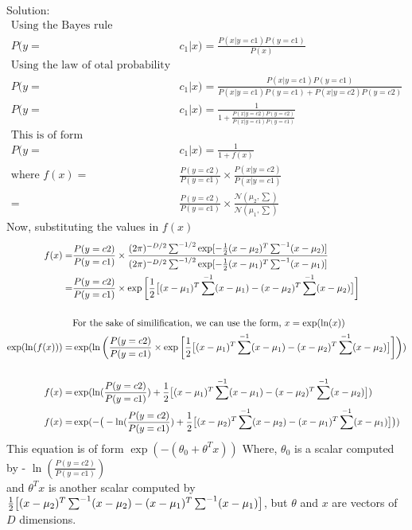 \documentclass[letterpaper,doc,notimes]{apa6}
\begin{document}
{\noindent Solution:
\begin{align*}
\text{Using the Bayes rule} & \\
	P(y =& c_1|x) = \frac{P(x | y=c1) P(y=c1)}{P(x)} \\
\text{Using the law of otal probability} \\
	P(y =& c_1|x) = \frac{P(x | y=c1) P(y=c1)}{P(x | y=c1) P(y=c1) + P(x | y=c2) P(y=c2)} \\
	P(y =& c_1|x) = \frac{1}{1 + \frac{ P(x | y=c2) P(y=c2)}{P(x | y=c1) P(y=c1)} } \\
\text{This is of form} \\
	P(y =& c_1|x) = \frac{1}{1 + f(x)} \\
\text{where } f(x) = & \frac{P(y=c2)}{P(y=c1)} \times \frac{P(x|y=c2) }{P(x|y=c1)} \\
	 = & \frac{P(y=c2)}{P(y=c1)} \times \frac{\mathcal{N}(\mu_2, \sum) }{\mathcal{N}(\mu_1, \sum)}
\end{align*}
Now, substituting the values in $f(x)$
\begin{align*}
f(x) = & \frac{P(y=c2)}{P(y=c1)} \times \frac{(2\pi)^{-D/2} \sum^{-1/2} \exp[-\frac{1}{2} (x-\mu_2)^T \space \sum^{-1} \space (x-\mu_2)] }  {(2\pi)^{-D/2} \sum^{-1/2} \exp[-\frac{1}{2} (x-\mu_1)^T \space \sum^{-1} \space (x-\mu_1)]}\\ 
  = & \frac{P(y=c2)}{P(y=c1)} \times \exp \bigg[\frac{1}{2}  \big[(x-\mu_1)^T \space \sum^{-1} \space (x-\mu_1) - (x-\mu_2)^T \space \sum^{-1} \space (x-\mu_2)  \big] \bigg] \\
  \\ 
&  \text{For the sake of similification, we can use the form, } x = \exp(\ln(x))\\ 
\exp(\ln(f(x))) = &\exp(\ln\bigg( \frac{P(y=c2)}{P(y=c1)} \times \exp \bigg[\frac{1}{2}  \big[(x-\mu_1)^T \space \sum^{-1} \space (x-\mu_1) - (x-\mu_2)^T \space \sum^{-1} \space (x-\mu_2)  \big] \bigg] \bigg)) \\
\\
f(x) = &\exp(\ln(\frac{P(y=c2)}{P(y=c1)}) + \frac{1}{2} \big[(x-\mu_1)^T \space \sum^{-1} \space (x-\mu_1) - (x-\mu_2)^T \space \sum^{-1} \space (x-\mu_2)  \big] ) \\
f(x) = &\exp( - \big(- \ln(\frac{P(y=c2)}{P(y=c1)}) + \frac{1}{2} \big[ (x-\mu_2)^T \space \sum^{-1} \space (x-\mu_2) - (x-\mu_1)^T \space \sum^{-1} \space (x-\mu_1)\big] \big)) \\
\end{align*}
This equation is of  form $\exp(-(\theta_0 + {\theta}^Tx))$
Where, $\theta_0$ is a scalar computed by - $\ln(\frac{P(y=c2)}{P(y=c1)}) $ \\
 and $\theta^Tx$ is another scalar computed by $\frac{1}{2} \big[(x-\mu_2)^T \space \sum^{-1} \space (x-\mu_2) - (x-\mu_1)^T \space \sum^{-1} \space (x-\mu_1)  \big]$, but $\theta$ and $x$ are vectors of $D$ dimensions.
 
}
\end{document}
